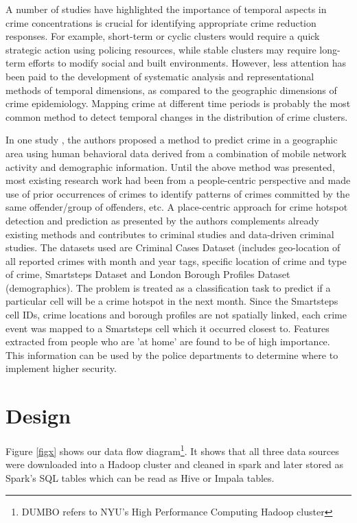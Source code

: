 \documentclass{sigkddExp}
\begin{document}
A number of studies have highlighted the importance of temporal aspects in crime concentrations is crucial for identifying appropriate crime reduction responses. For example, short-term or cyclic clusters would require a quick strategic action using policing resources, while stable clusters may require long-term efforts to modify social and built environments. However, less attention has been paid to the development of systematic analysis and representational methods of temporal dimensions, as compared to the geographic dimensions of crime epidemiology. Mapping crime at different time periods is probably the most common method to detect temporal changes in the distribution of crime clusters.



In one study \cite{OUAC}, the authors proposed a method to predict crime in a geographic area using human behavioral data derived from a combination of mobile network activity and demographic information. Until the above method was presented, most existing research work had been from a people-centric perspective and made use of prior occurrences of crimes to identify patterns of crimes committed by the same offender/group of offenders, etc. A place-centric approach for crime hotspot detection and prediction as presented by the authors complements already existing methods and contributes to criminal studies and data-driven criminal studies. 
The datasets used are Criminal Cases Dataset (includes geo-location of all reported crimes with month and year tags, specific location of crime and type of crime, Smartsteps Dataset and London Borough Profiles Dataset (demographics). The problem is treated as a classification task to predict if a particular cell will be a crime hotspot in the next month. 
Since the Smartsteps cell IDs, crime locations and borough profiles are not spatially linked, each crime event was mapped to a Smartsteps cell which it occurred closest to.  
Features extracted from people who are 'at home' are found to be of high importance. This information can be used by the police departments to determine where to implement higher security.


\section{Design}

Figure \ref{figx} shows our data flow diagram\footnote{DUMBO refers to NYU's High Performance Computing Hadoop cluster}.  It shows that all three data sources were downloaded into a Hadoop cluster and cleaned in spark and later stored as Spark's SQL tables which can be read as Hive or Impala tables.
\end{document}
